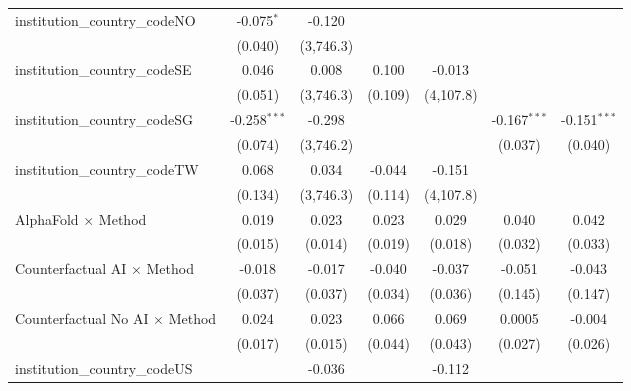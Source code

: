 \begin{tabular}{lcccccc}
   institution\_country\_codeNO          & -0.075$^{*}$   & -0.120        &               &               &                &   \\   
                                         & (0.040)        & (3,746.3)     &               &               &                &   \\   
   institution\_country\_codeSE          & 0.046          & 0.008         & 0.100         & -0.013        &                &   \\   
                                         & (0.051)        & (3,746.3)     & (0.109)       & (4,107.8)     &                &   \\   
   institution\_country\_codeSG          & -0.258$^{***}$ & -0.298        &               &               & -0.167$^{***}$ & -0.151$^{***}$\\   
                                         & (0.074)        & (3,746.2)     &               &               & (0.037)        & (0.040)\\   
   institution\_country\_codeTW          & 0.068          & 0.034         & -0.044        & -0.151        &                &   \\   
                                         & (0.134)        & (3,746.3)     & (0.114)       & (4,107.8)     &                &   \\   
   AlphaFold $\times$ Method             & 0.019          & 0.023         & 0.023         & 0.029         & 0.040          & 0.042\\   
                                         & (0.015)        & (0.014)       & (0.019)       & (0.018)       & (0.032)        & (0.033)\\   
   Counterfactual AI $\times$ Method     & -0.018         & -0.017        & -0.040        & -0.037        & -0.051         & -0.043\\   
                                         & (0.037)        & (0.037)       & (0.034)       & (0.036)       & (0.145)        & (0.147)\\   
   Counterfactual No AI $\times$ Method  & 0.024          & 0.023         & 0.066         & 0.069         & 0.0005         & -0.004\\   
                                         & (0.017)        & (0.015)       & (0.044)       & (0.043)       & (0.027)        & (0.026)\\   
   institution\_country\_codeUS          &                & -0.036        &               & -0.112        &                &   \\   

\end{tabular}
